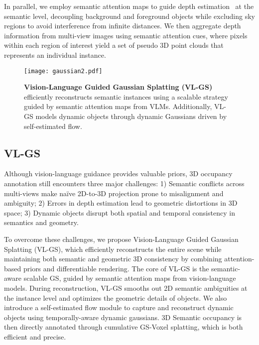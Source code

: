 In parallel, we employ semantic attention maps to guide depth estimation~\cite{piccinelli2024unidepth, yang2024depth} at the semantic level, decoupling background and foreground objects while excluding sky regions to avoid interference from infinite distances. We then aggregate depth information from multi-view images using semantic attention cues, where pixels within each region of interest yield a set of pseudo 3D point clouds that represents an individual instance.


\begin{figure}[ht]
  \centering
  \texttt{[image: gaussian2.pdf]}
  \vspace{-2mm}
  \caption{\textbf{Vision-Language Guided Gaussian Splatting (VL-GS)} efficiently reconstructs semantic instances using a scalable strategy guided by semantic attention maps from VLMs. Additionally, VL-GS models dynamic objects through dynamic Gaussians driven by self-estimated flow.}
  \label{fig:gaussians}
  \vspace{-2mm}
\end{figure}


\subsection{VL-GS}
Although vision-language guidance provides valuable priors, 3D occupancy annotation still encounters three major challenges: 1) Semantic conflicts across multi-views make naïve 2D-to-3D projection prone to misalignment and ambiguity; 2) Errors in depth estimation lead to geometric distortions in 3D space; 3) Dynamic objects disrupt both spatial and temporal consistency in semantics and geometry.

To overcome these challenges, we propose Vision-Language Guided Gaussian Splatting (VL-GS), which efficiently reconstructs the entire scene while maintaining both semantic and geometric 3D consistency by combining attention-based priors and differentiable rendering. The core of VL-GS is the semantic-aware scalable GS, guided by semantic attention maps from vision-language models. During reconstruction, VL-GS smooths out 2D semantic ambiguities at the instance level and optimizes the geometric details of objects. We also introduce a self-estimated flow module to capture and reconstruct dynamic objects using temporally-aware dynamic gaussians. 3D Semantic occupancy is then directly annotated through cumulative GS-Voxel splatting, which is both efficient and precise.




